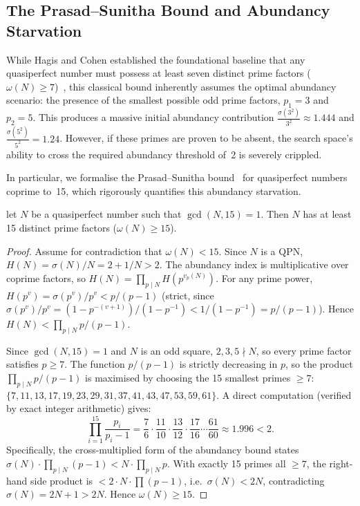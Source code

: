 \subsection{The Prasad--Sunitha Bound and Abundancy Starvation}
\label{subsec:prasad_sunitha}

While Hagis and Cohen established the foundational baseline that any
quasiperfect number must possess at least seven distinct prime factors
($\omega(N) \ge 7$)~\cite{hagis1982}, this classical bound inherently
assumes the optimal abundancy scenario: the presence of the smallest
possible odd prime factors, $p_1 = 3$ and $p_2 = 5$.  This produces a
massive initial abundancy contribution
$\frac{\sigma(3^2)}{3^2} \approx 1.444$ and
$\frac{\sigma(5^2)}{5^2} = 1.24$.  However, if these primes are proven
to be absent, the search space's ability to cross the required abundancy
threshold of~2 is severely crippled.

In particular, we formalise the Prasad--Sunitha
bound~\cite{prasad_sunitha} for quasiperfect numbers coprime to~15,
which rigorously quantifies this abundancy starvation.

\begin{theorem}\label{thm:prasad-sunitha}
  let $N$ be a quasiperfect number such that $\gcd(N, 15) = 1$.  Then
  $N$ has at least 15 distinct prime factors ($\omega(N) \ge 15$).
\end{theorem}

\begin{proof}
Assume for contradiction that $\omega(N) < 15$.  Since $N$ is a QPN,
$H(N) = \sigma(N)/N = 2 + 1/N > 2$.  The abundancy index is multiplicative
over coprime factors, so
$H(N) = \prod_{p \mid N} H(p^{v_p(N)})$.
For any prime power, $H(p^v) = \sigma(p^v)/p^v < p/(p-1)$ (strict, since
$\sigma(p^v)/p^v = (1-p^{-(v+1)})/(1-p^{-1}) < 1/(1-p^{-1}) = p/(p-1)$).
Hence $H(N) < \prod_{p \mid N} p/(p-1)$.

Since $\gcd(N,15)=1$ and $N$ is an odd square, $2, 3, 5 \nmid N$, so
every prime factor satisfies $p \ge 7$.  The function $p/(p-1)$ is strictly
decreasing in $p$, so the product $\prod_{p \mid N} p/(p-1)$ is maximised
by choosing the 15 smallest primes $\ge 7$:
$\{7, 11, 13, 17, 19, 23, 29, 31, 37, 41, 43, 47, 53, 59, 61\}$.
A direct computation (verified by exact integer arithmetic) gives:
\[
  \prod_{i=1}^{15} \frac{p_i}{p_i - 1}
  = \frac{7}{6}\cdot\frac{11}{10}\cdot\frac{13}{12}\cdot\frac{17}{16}\cdots\frac{61}{60}
  \approx 1.996 < 2.
\]
Specifically, the cross-multiplied form of the abundancy bound states
$\sigma(N) \cdot \prod_{p\mid N}(p-1) < N \cdot \prod_{p\mid N} p$.  With exactly
15 primes all $\ge 7$, the right-hand side product is $< 2 \cdot N \cdot \prod(p-1)$,
i.e.\ $\sigma(N) < 2N$, contradicting $\sigma(N) = 2N+1 > 2N$.
Hence $\omega(N) \ge 15$.
\end{proof}

